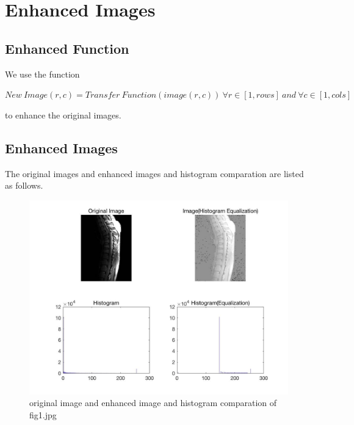 \documentclass[11pt,oneside]{book}
\begin{document}
\section{Enhanced Images}
\subsection{Enhanced Function}
We use the function\\
\begin{center}
$New\ Image(r,c) = Transfer\ Function(image(r,c))\ \forall r \in [1,rows]\ and\ \forall c \in [1,cols]$
\end{center}
to enhance the original images. 
\subsection{Enhanced Images}
The original images and enhanced images and histogram comparation are listed as follows.
\begin{figure}[!htb]
   \centering  
   \includegraphics[width=1.0\textwidth]{images/1/image1.jpg}
   \caption{original image and enhanced image and histogram comparation of fig1.jpg}  
\end{figure}
\end{document}
